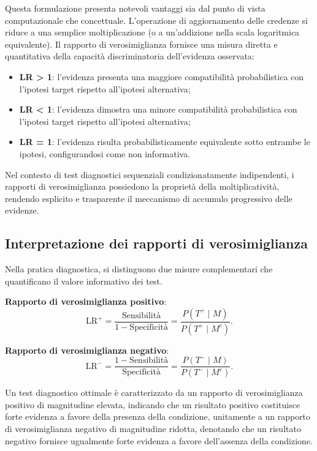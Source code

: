 \documentclass[
  letterpaper,
  DIV=11,
  numbers=noendperiod,
  oneside]{scrreprt}
\providecommand{\tightlist}{%
  \setlength{\itemsep}{0pt}\setlength{\parskip}{0pt}}
\theoremstyle{definition}
\theoremstyle{plain}
\theoremstyle{definition}
\theoremstyle{remark}
\begin{document}
Questa formulazione presenta notevoli vantaggi sia dal punto di vista
computazionale che concettuale. L'operazione di aggiornamento delle
credenze si riduce a una semplice moltiplicazione (o a un'addizione
nella scala logaritmica equivalente). Il rapporto di verosimiglianza
fornisce una misura diretta e quantitativa della capacità
discriminatoria dell'evidenza osservata:

\begin{itemize}
\tightlist
\item
  \textbf{LR \textgreater{} 1}: l'evidenza presenta una maggiore
  compatibilità probabilistica con l'ipotesi target rispetto all'ipotesi
  alternativa;
\item
  \textbf{LR \textless{} 1}: l'evidenza dimostra una minore
  compatibilità probabilistica con l'ipotesi target rispetto all'ipotesi
  alternativa;
\item
  \textbf{LR = 1}: l'evidenza risulta probabilisticamente equivalente
  sotto entrambe le ipotesi, configurandosi come non informativa.
\end{itemize}

Nel contesto di test diagnostici sequenziali condizionatamente
indipendenti, i rapporti di verosimiglianza possiedono la proprietà
della moltiplicatività, rendendo esplicito e trasparente il meccanismo
di accumulo progressivo delle evidenze.

\subsection{Interpretazione dei rapporti di
verosimiglianza}\label{interpretazione-dei-rapporti-di-verosimiglianza}

Nella pratica diagnostica, si distinguono due misure complementari che
quantificano il valore informativo dei test.

\textbf{Rapporto di verosimiglianza positivo}: \[
\text{LR}^+ = \frac{\text{Sensibilità}}{1 - \text{Specificità}} = \frac{P(T^+ \mid M)}{P(T^+ \mid M^c)}.
\]

\textbf{Rapporto di verosimiglianza negativo}: \[
\text{LR}^- = \frac{1 - \text{Sensibilità}}{\text{Specificità}} = \frac{P(T^- \mid M)}{P(T^- \mid M^c)}.
\]

Un test diagnostico ottimale è caratterizzato da un rapporto di
verosimiglianza positivo di magnitudine elevata, indicando che un
risultato positivo costituisce forte evidenza a favore della presenza
della condizione, unitamente a un rapporto di verosimiglianza negativo
di magnitudine ridotta, denotando che un risultato negativo fornisce
ugualmente forte evidenza a favore dell'assenza della condizione.
\end{document}
